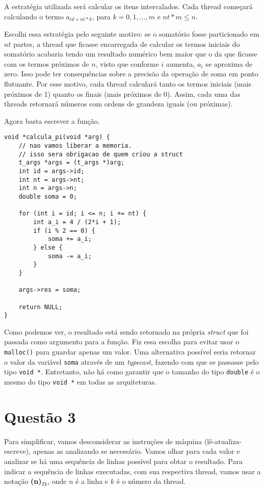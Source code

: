 \documentclass{article}
\begin{document}
A estratégia utilizada será calcular os itens intercalados. Cada thread começará calculando o termo
$a_{id+nt*k}$, para $k=0,1,...,m$ e $nt*m \le n$.

Escolhi essa estratégia pelo seguinte motivo: se o somatório fosse particionado em $nt$ partes,
a thread que ficasse encarregada de calcular os termos iniciais do somatório acabaria tendo um
resultado numérico bem maior que o da que ficasse com os termos próximos de $n$, visto que conforme
$i$ aumenta, $a_i$ se aproxima de zero. Isso pode ter consequências sobre a precisão da
operação de soma em ponto flutuante. Por esse motivo, cada thread calculará tanto os termos iniciais
(mais próximos de 1) quanto os finais (mais próximos de 0). Assim, cada uma das threads retornará números
com ordens de grandeza iguais (ou próximas).

Agora basta escrever a função.

\begin{verbatim}
void *calcula_pi(void *arg) {
	// nao vamos liberar a memoria.
	// isso sera obrigacao de quem criou a struct
	t_args *args = (t_args *)arg;
	int id = args->id;
	int nt = args->nt;
	int n = args->n;
	double soma = 0;

	for (int i = id; i <= n; i += nt) {
		int a_i = 4 / (2*i + 1);
		if (i % 2 == 0) {
			soma += a_i;
		} else {
			soma -= a_i;
		}
	}

	args->res = soma;

	return NULL;
}
\end{verbatim}

Como podemos ver, o resultado está sendo retornado na própria \emph{struct} que foi passada como
argumento para a função. Fiz essa escolha para evitar usar o \texttt{malloc()} para guardar apenas
um valor. Uma alternativa possível seria retornar o valor da variável \texttt{soma} através de um
\emph{typecast}, fazendo com que se passasse pelo tipo \texttt{void *}. Entretanto, não há como garantir
que o tamanho do tipo \texttt{double} é o mesmo do tipo \texttt{void *} em todas as arquiteturas.

\section*{Questão 3}

Para simplificar, vamos desconsiderar as instruções de máquina (lê-atualiza-escreve), apenas as analizando
se necessário. Vamos olhar para cada valor e analizar se há uma sequência de linhas possível para obtar o
resultado. Para indicar a sequência de linhas executadas, com sua respectiva thread, vamos usar a notação
\textbf{(n)}$_{Tk}$, onde $n$ é a linha e $k$ é o número da thread.
\end{document}
